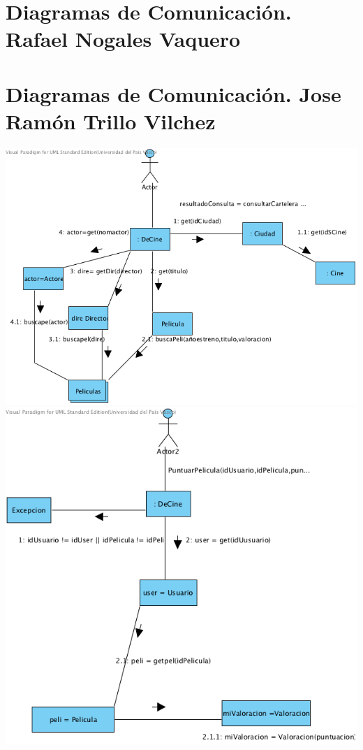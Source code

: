 \documentclass{article}
\begin{document}
\section{Diagramas de Comunicación. Rafael Nogales Vaquero}
\section{Diagramas de Comunicación. Jose Ramón Trillo Vilchez}
\begin{center}
\includegraphics[width=1.3\linewidth]{./J-1}
\includegraphics[width=1.3\linewidth]{./J-2}

\end{center}
\end{document}
